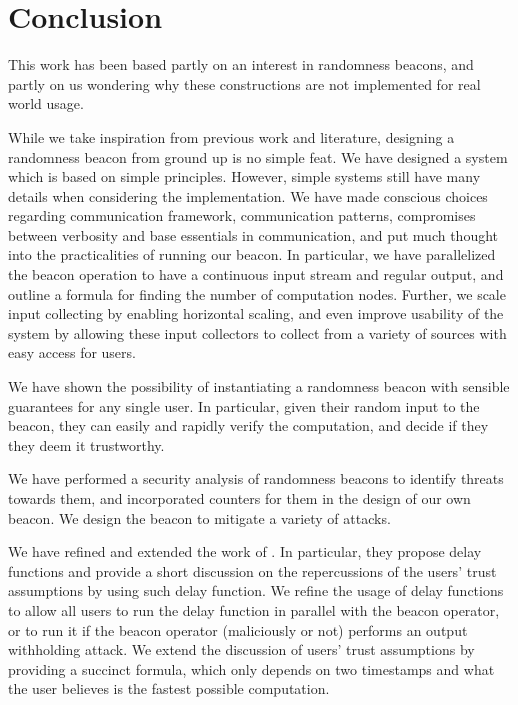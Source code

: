 \section{Conclusion}%
\label{sec:conclusion}

This work has been based partly on an interest in randomness beacons, and partly on us wondering why these constructions are not implemented for real world usage.

While we take inspiration from previous work and literature, designing a randomness beacon from ground up is no simple feat.
We have designed a system which is based on simple principles.
However, simple systems still have many details when considering the implementation.
We have made conscious choices regarding communication framework, communication patterns, compromises between verbosity and base essentials in communication, and put much thought into the practicalities of running our beacon.
In particular, we have parallelized the beacon operation to have a continuous input stream and regular output, and outline a formula for finding the number of computation nodes.
Further, we scale input collecting by enabling horizontal scaling, and even improve usability of the system by allowing these input collectors to collect from a variety of sources with easy access for users.

We have shown the possibility of instantiating a randomness beacon with sensible guarantees for any single user. In particular, given their random input to the beacon, they can easily and rapidly verify the computation, and decide if they they deem it trustworthy.

We have performed a security analysis of randomness beacons to identify threats towards them, and incorporated counters for them in the design of our own beacon. We design the beacon to mitigate a variety of attacks.

We have refined and extended the work of \citet{randomzoo}.
In particular, they propose delay functions and provide a short discussion on the repercussions of the users' trust assumptions by using such delay function.
We refine the usage of delay functions to allow all users to run the delay function in parallel with the beacon operator, or to run it if the beacon operator (maliciously or not) performs an output withholding attack.
We extend the discussion of users' trust assumptions by providing a succinct formula, which only depends on two timestamps and what the user believes is the fastest possible computation.

